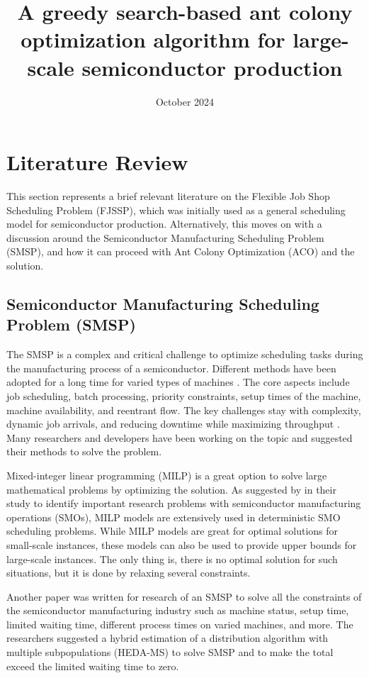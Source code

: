 \documentclass{article}
\title{A greedy search-based ant colony optimization algorithm for large-scale semiconductor production}
\author{}
\date{October 2024}
\begin{document}
\maketitle

\section{Literature Review}
This section represents a brief relevant literature on the Flexible Job Shop Scheduling Problem (FJSSP), which was initially used as a general scheduling model for semiconductor production. Alternatively, this moves on with a discussion around the Semiconductor Manufacturing Scheduling Problem (SMSP), and how it can proceed with Ant Colony Optimization (ACO) and the solution.
\subsection{Semiconductor Manufacturing Scheduling Problem (SMSP)}
The SMSP is a complex and critical challenge to optimize scheduling tasks during the manufacturing process of a semiconductor. Different methods have been adopted for a long time for varied types of machines \cite{chan2024situation}. The core aspects include job scheduling, batch processing, priority constraints, setup times of the machine, machine availability, and reentrant flow. The key challenges stay with complexity, dynamic job arrivals, and reducing downtime while maximizing throughput \cite{el2023hybrid}. Many researchers and developers have been working on the topic and suggested their methods to solve the problem.
\vspace{1em}

Mixed-integer linear programming (MILP) is a great option to solve large mathematical problems by optimizing the solution. As suggested by \cite{fang2023problems} in their study to identify important research problems with semiconductor manufacturing operations (SMOs), MILP models are extensively used in deterministic SMO scheduling problems. While MILP models are great for optimal solutions for small-scale instances, these models can also be used to provide upper bounds for large-scale instances. The only thing is, there is no optimal solution for such situations, but it is done by relaxing several constraints. 
\vspace{1em}

Another paper \cite{wang2014hybrid} was written for research of an SMSP to solve all the constraints of the semiconductor manufacturing industry such as machine status, setup time, limited waiting time, different process times on varied machines, and more. The researchers suggested a hybrid estimation of a distribution algorithm with multiple subpopulations (HEDA-MS) to solve SMSP and to make the total exceed the limited waiting time to zero.
\end{document}
